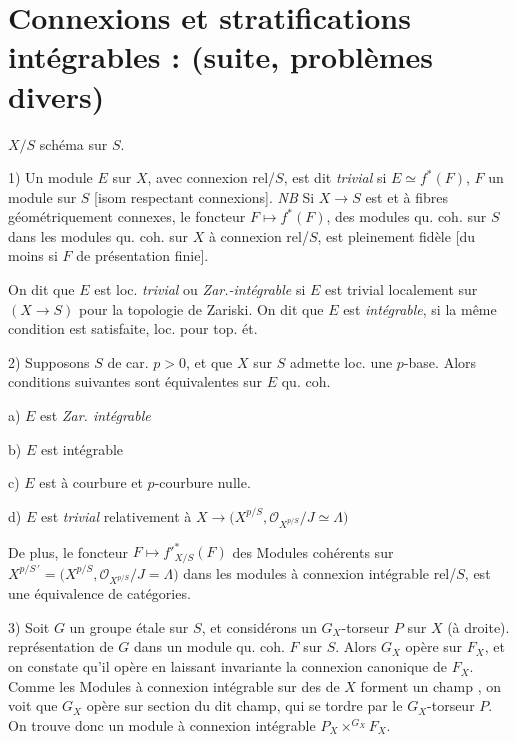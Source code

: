 \documentclass[11pt,a4paper]{article}
\begin{document}
\section{Connexions et stratifications intégrables : (suite, problèmes divers)}

$X/S$ schéma sur $S$.

1) Un module  $E$ sur $X$, avec connexion rel/$S$, est dit
\emph{trivial} si $E\simeq f^*(F)$, $F$ un module  sur $S$
[isom respectant connexions]. \emph{NB} Si $X\to S$ est
   et à fibres
géométriquement connexes,  le foncteur
$F\mapsto f^*(F)$, des modules qu. coh. sur $S$ dans les modules qu. coh. sur
$X$ à connexion rel/$S$, est pleinement fidèle [du moins
si $F$ de présentation finie].

On dit que $E$ est loc. \emph{trivial} ou \emph{Zar.-intégrable} si $E$ est
trivial localement sur $(X\to S)$ pour la topologie de Zariski. On dit que
$E$ est \emph{intégrable}, si la même condition est satisfaite, loc. pour top.
ét.

2) Supposons $S$ de car. $p>0$, et que $X$ sur $S$ admette loc. une $p$-base.
Alors  conditions suivantes sont
équivalentes sur $E$ qu. coh.

a) $E$ est \emph{Zar. intégrable}

b) $E$ est intégrable

c) $E$ est à courbure et $p$-courbure nulle.

d) $E$ est \emph{trivial} relativement à
$X\to\bigl(X^{p/S}, \mathcal{O}_{X^{p/S}}/J\simeq\Lambda\bigr)$

De plus, le foncteur $F\mapsto f'^{*}_{X/S}(F)$ des Modules
cohérents sur
$X^{p/S\,\prime} = \bigl(X^{p/S}, \mathcal{O}_{X^{p/S}}/J = \Lambda\bigr)$ dans les
modules  à connexion intégrable rel/$S$, est une
équivalence de catégories.

3) Soit $G$ un groupe  étale sur $S$, et considérons un
$G_X$-torseur $P$ sur $X$ (à droite).  
représentation de $G$ dans un module qu. coh. $F$ sur $S$. Alors $G_X$ opère
sur $F_X$, et on constate qu'il opère en laissant invariante la connexion
canonique de $F_X$. Comme les Modules à connexion intégrable  sur
des  de $X$ forment un champ , on voit que $G_X$ opère sur 
section  du dit champ, qui se  tordre par le
$G_X$-torseur $P$. On trouve donc un module à connexion intégrable
$P_X\times^{G_X}F_X$.
\end{document}
